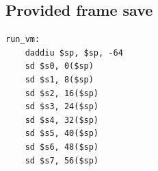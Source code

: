 \subsection{Provided frame save}
\begin{verbatim}
run_vm:
    daddiu $sp, $sp, -64
    sd $s0, 0($sp)
    sd $s1, 8($sp)
    sd $s2, 16($sp)
    sd $s3, 24($sp)
    sd $s4, 32($sp)
    sd $s5, 40($sp)
    sd $s6, 48($sp)
    sd $s7, 56($sp)
\end{verbatim}
